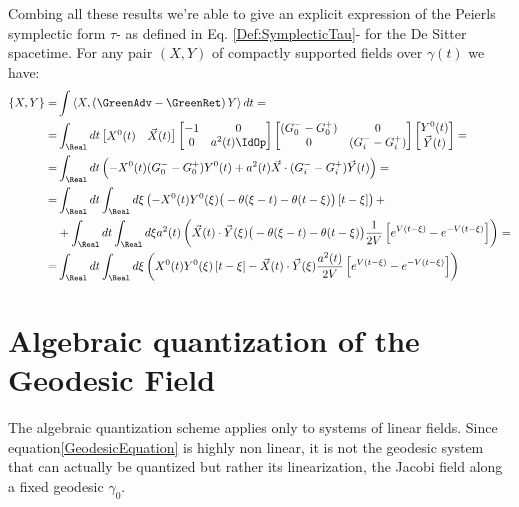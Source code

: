 \documentclass[Main]{subfiles}
\begin{document}
			Combing all these results we're able to give an explicit expression of the Peierls symplectic form $\tau$- as defined in Eq. 	\ref{Def:SymplecticTau}- for the De Sitter spacetime.
			For any pair $(X, Y)$ of compactly supported fields over $\gamma(t)$ we have:
			\begin{align*}
			\{X ,Y \} =&\int \left\langle X, \left(\GreenAdv - \GreenRet \right)Y \right\rangle dt =	\\
			=&
			\int_\Real dt  
				 \begin{bmatrix}  
					 X^0(t) & \vec{X}(t) \\
				 \end{bmatrix}
				 \begin{bmatrix}  
				 	-1 & 0 \\
				 	0 & a^2(t)\IdOp
				 \end{bmatrix}			
				 \begin{bmatrix}  
				 	(G^-_0 - G^+_0) & 0 \\
				 	0 & (G^-_i - G^+_i)
				 \end{bmatrix}	
				 \begin{bmatrix}  
				 	Y^0(t) \\ \vec{Y}(t)
				 \end{bmatrix}	
				 = \\
			=&
				\int_\Real dt  \left(
					-X^0(t) (G^-_0 - G^+_0)Y^0(t)+
					a^2(t)\vec{X} \cdot (G^-_i- G^+_i)\vec{Y}(t)
				\right) = \\
			=&
				\int_\Real dt 				\int_\Real d\xi \left(
					-X^0(t)Y^0(\xi)\big(-\theta(\xi -t)-\theta(t-\xi )\big)\left[t-\xi \right] \right) +\\
			&+
					\int_\Real dt 				\int_\Real d\xi a^2(t) \left(
					\vec{X}(t) \cdot \vec{Y}(\xi)
						\big(-\theta(\xi -t)-\theta(t-\xi )\big) \frac{1}{2V}\left[ e^{V(t-\xi)} - e^{-V(t-\xi)}\right]
					\right) = \\
			=& \int_\Real dt 				\int_\Real d\xi \left(
				X^0(t)Y^0(\xi)\left[t-\xi \right]				-
				\vec{X}(t) \cdot \vec{Y}(\xi) \frac{a^2(t)}{2V}\left[ e^{V(t-\xi)} - e^{-V(t-\xi)}\right]
				\right)
			\end{align*}					
		

\section{Algebraic quantization of the Geodesic Field}
	The algebraic quantization scheme applies only to %
	systems of linear fields.
	Since equation\ref{GeodesicEquation} is highly non linear,  it is not the geodesic system that can actually be quantized but rather its linearization, the Jacobi field along a fixed geodesic $\gamma_0$.
	
\end{document}
